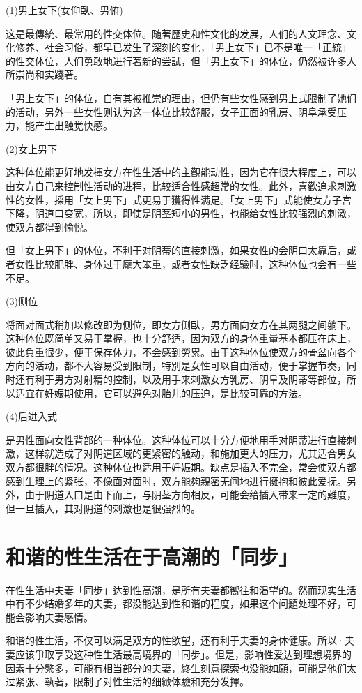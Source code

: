 \documentclass[12pt,UTF8]{ctexbook}
\begin{document}
(1)男上女下(女仰臥、男俯)

这是最傳統、最常用的性交体位。随著歷史和性文化的发展，人们的人文理念、文化修养、社会习俗，都早已发生了深刻的变化，「男上女下」已不是唯一「正統」的性交体位，人们勇敢地进行著新的尝試，但「男上女下」的体位，仍然被许多人所崇尚和实踐著。

「男上女下」的体位，自有其被推崇的理由，但仍有些女性感到男上式限制了她们的活动，另外一些女性则认为这一体位比较舒服，女子正面的乳房、阴阜承受压力，能产生出触觉快感。

(2)女上男下

这种体位能更好地发揮女方在性生活中的主觀能动性，因为它在很大程度上，可以由女方自己来控制性活动的进程，比较适合性感超常的女性。此外，喜歡追求刺激性的女性，採用「女上男下」式更易于獲得性满足。「女上男下」式能使女方子宫下降，阴道口变宽，所以，即使是阴茎短小的男性，也能给女性比较强烈的刺激，使双方都得到愉悦。

但「女上男下」的体位，不利于对阴蒂的直接刺激，如果女性的会阴口太靠后，或者女性比较肥胖、身体过于龐大笨重，或者女性缺乏经驗时，这种体位也会有一些不足。

(3)侧位

将面对面式稍加以修改即为侧位，即女方侧臥，男方面向女方在其两腿之间躺下。这种体位既简单又易于掌握，也十分舒适，因为双方的身体重量基本都压在床上，彼此負重很少，便于保存体力，不会感到勞累。由于这种体位使双方的骨盆向各个方向的活动，都不大容易受到限制，特別是女性可以自由活动，便于掌握节奏，同时还有利于男方对射精的控制，以及用手来刺激女方乳房、阴阜及阴蒂等部位，所以适宜在妊娠期使用，它可以避免对胎儿的压迫，是比较可靠的方法。

(4)后进入式

是男性面向女性背部的一种体位。这种体位可以十分方便地用手对阴蒂进行直接刺激，这样就造成了对阴道区域的更紧密的触动，和施加更大的压力，尤其适合男女双方都很胖的情况。这种体位也适用于妊娠期。缺点是插入不完全，常会使双方都感到生理上的紧张，不像面对面时，双方能夠親密无间地进行擁抱和彼此爱抚。另外，由于阴道入口是由下而上，与阴茎方向相反，可能会给插入带来一定的難度，但一旦插入，其对阴道的刺激也是很强烈的。

\section{和谐的性生活在于高潮的「同步」}

在性生活中夫妻「同步」达到性高潮，是所有夫妻都嚮往和渴望的。然而现实生活中有不少结婚多年的夫妻，都没能达到性和谐的程度，如果这个问題处理不好，可能会影响夫妻感情。

和谐的性生活，不仅可以满足双方的性欲望，还有利于夫妻的身体健康。所以·夫妻应该爭取享受这种性生活最高境界的「同步」。但是，影响性爱达到理想境界的因素十分繁多，可能有相当部分的夫妻，終生刻意探索也没能如願，可能是他们太过紧张、執著，限制了对性生活的细緻体驗和充分发揮。
\end{document}
